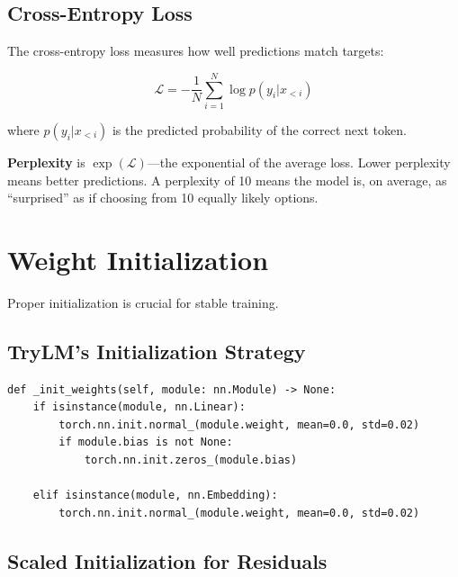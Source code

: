 \subsection{Cross-Entropy Loss}

The cross-entropy loss measures how well predictions match targets:

\begin{equation}
\mathcal{L} = -\frac{1}{N} \sum_{i=1}^{N} \log p(y_i | x_{<i})
\end{equation}

where $p(y_i | x_{<i})$ is the predicted probability of the correct next token.

\begin{keypoint}
\textbf{Perplexity} is $\exp(\mathcal{L})$---the exponential of the average loss. Lower perplexity means better predictions. A perplexity of 10 means the model is, on average, as ``surprised'' as if choosing from 10 equally likely options.
\end{keypoint}

\section{Weight Initialization}

Proper initialization is crucial for stable training.

\subsection{TryLM's Initialization Strategy}

\begin{lstlisting}[style=python, caption={Weight initialization from model.py}]
def _init_weights(self, module: nn.Module) -> None:
    if isinstance(module, nn.Linear):
        torch.nn.init.normal_(module.weight, mean=0.0, std=0.02)
        if module.bias is not None:
            torch.nn.init.zeros_(module.bias)

    elif isinstance(module, nn.Embedding):
        torch.nn.init.normal_(module.weight, mean=0.0, std=0.02)
\end{lstlisting}

\subsection{Scaled Initialization for Residuals}

